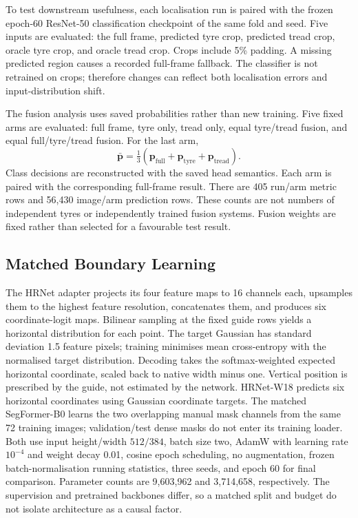 To test downstream usefulness, each localisation run is paired with the frozen epoch-60 ResNet-50 classification checkpoint of the same fold and seed. Five inputs are evaluated: the full frame, predicted tyre crop, predicted tread crop, oracle tyre crop, and oracle tread crop. Crops include 5\% padding. A missing predicted region causes a recorded full-frame fallback. The classifier is not retrained on crops; therefore changes can reflect both localisation errors and input-distribution shift.

The fusion analysis uses saved probabilities rather than new training. Five fixed arms are evaluated: full frame, tyre only, tread only, equal tyre/tread fusion, and equal full/tyre/tread fusion. For the last arm,
\begin{equation}
\bar{\boldsymbol p}=\tfrac{1}{3}
(\boldsymbol p_{\mathrm{full}}+\boldsymbol p_{\mathrm{tyre}}+
\boldsymbol p_{\mathrm{tread}}).
\label{eq:fusion}
\end{equation}
Class decisions are reconstructed with the saved head semantics. Each arm is paired with the corresponding full-frame result. There are 405 run/arm metric rows and 56,430 image/arm prediction rows. These counts are not numbers of independent tyres or independently trained fusion systems. Fusion weights are fixed rather than selected for a favourable test result.

\subsection{Matched Boundary Learning}
The HRNet adapter projects its four feature maps to 16 channels each, upsamples them to the highest feature resolution, concatenates them, and produces six coordinate-logit maps. Bilinear sampling at the fixed guide rows yields a horizontal distribution for each point. The target Gaussian has standard deviation 1.5 feature pixels; training minimises mean cross-entropy with the normalised target distribution. Decoding takes the softmax-weighted expected horizontal coordinate, scaled back to native width minus one. Vertical position is prescribed by the guide, not estimated by the network.
HRNet-W18 predicts six horizontal coordinates using Gaussian coordinate targets. The matched SegFormer-B0 learns the two overlapping manual mask channels from the same 72 training images; validation/test dense masks do not enter its training loader. Both use input height/width $512/384$, batch size two, AdamW with learning rate $10^{-4}$ and weight decay 0.01, cosine epoch scheduling, no augmentation, frozen batch-normalisation running statistics, three seeds, and epoch 60 for final comparison. Parameter counts are 9,603,962 and 3,714,658, respectively. The supervision and pretrained backbones differ, so a matched split and budget do not isolate architecture as a causal factor.

